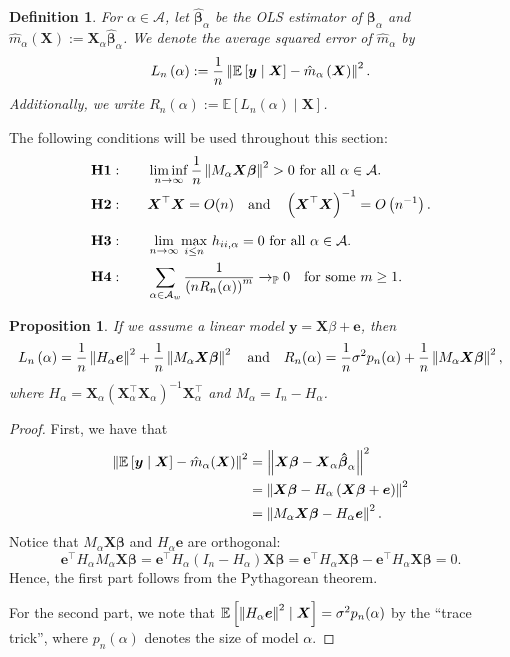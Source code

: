 \documentclass[12pt, letter paper]{article}
\newcommand{\1}{\mathmybb{1}}
\newtheorem{definition}{Definition}[section]
\newtheorem{proposition}{Proposition}[section]
\newcommand{\0}{\emptyset}
\newcommand{\prob}{\mathbb{P}}
\newcommand{\Ep}[1]{\mathbb{E}\left[ #1 \right]}
\newcommand{\paren}[1]{\left(#1 \right)}
\newcommand{\norm}[1]{\left|\hspace{-1pt}\left|#1 \right|\hspace{-1pt}\right|}
\newcommand{\normsq}[1]{\norm{#1}^{2}}
\newcommand{\Acal}{\mathcal{A}}
\newcommand{\X}{\boldsymbol{X}}
\newcommand{\y}{\boldsymbol{y}}
\newcommand{\e}{\boldsymbol{e}}
\newcommand{\bbeta}{\boldsymbol{\beta}}
\newcommand{\bbetahat}{\boldsymbol{\hat{\beta}}}
\newcommand{\Loss}[1]{L_{n}\paren{#1}}
\begin{document}
\begin{definition}
    For \(\alpha\in\Acal\), let \(\bbetahat_{\alpha}\) be the OLS estimator of \(\bbeta_{\alpha}\) and \(\hat{m}_{\alpha}(\X):=\X_{\alpha}\bbetahat_{\alpha}\). We denote the average squared error of \(\hat{m}_{\alpha}\) by
    \[\Loss{\alpha}:=\frac{1}{n}\normsq{\Ep{\y\mid\X} - \hat{m}_{\alpha}\paren{\X}}.\]
    Additionally, we write
    \(R_{n}(\alpha):= \Ep{\Loss{\alpha}\mid\X}\).
\end{definition}

    The following conditions will be used throughout this section:
    \begin{align*}
        &\mathbf{H1:}\qquad \liminf_{n\to\infty} \frac{1}{n}\normsq{M_{\alpha}\X\bbeta}>0 \text{ for all }\alpha \in\Acal.\\
        &\mathbf{H2:} \qquad \X^{\top}\X = O(n)\quad\text{and}\quad\paren{\X^{\top}\X}^{-1}= O\paren{n^{-1}}.\\[2.5mm]
        &\mathbf{H3:}\qquad \lim_{n\to\infty}\max_{i\leq n}\,h_{ii,\alpha} = 0 \text{ for all }\alpha \in\Acal.\\
        &\mathbf{H4:}\qquad \sum_{\alpha\in\Acal_{w}}\frac{1}{\paren{nR_{n}(\alpha)}^{m}}\to_{\prob}0\quad\text{for some }m\geq 1.
    \end{align*}

\begin{proposition}
    If we assume a linear model \(\y = \X\beta + \e\), then
    \[\Loss{\alpha} = \frac{1}{n}\normsq{H_{\alpha}\e} + \frac{1}{n}\normsq{M_{\alpha}\X\bbeta}\quad\text{and}\quad R_{n}(\alpha) = \frac{1}{n}\sigma^{2}p_{n}(\alpha) + \frac{1}{n}\normsq{M_{\alpha}\X\bbeta},\]
    where \(H_{\alpha} = \X_{\alpha}\paren{\X_{\alpha}^{\top}\X_{\alpha}}^{-1}\X_{\alpha}^{\top}\) and \(M_{\alpha}= I_{n} - H_{\alpha}\).
\end{proposition}

\begin{proof}
    First, we have that
    \begin{align*}
        \normsq{\Ep{\y\mid\X} - \hat{m}_{\alpha}(\X)} &= \normsq{\X\bbeta - \X_{\alpha}\bbetahat_{\alpha}}\\
        &= \normsq{\X\bbeta - H_{\alpha}\paren{\X\bbeta + \e}}\\
        &= \normsq{M_{\alpha}\X\bbeta - H_{\alpha}\e}.
    \end{align*}
    Notice that \(M_{\alpha}\X\bbeta\) and \(H_{\alpha}\e\) are orthogonal:
    \[\e^{\top}H_{\alpha}M_{\alpha}\X\bbeta  = \e^{\top}H_{\alpha}\paren{I_{n} - H_{\alpha}}\X\bbeta = \e^{\top}H_{\alpha}\X\bbeta - \e^{\top}H_{\alpha}\X\bbeta = 0.\]
    Hence, the first part follows from the Pythagorean theorem.

    For the second part, we note that \(\Ep{\normsq{H_{\alpha}\e}\mid\X} = \sigma^{2}p_{n}(\alpha)\) by the ``trace trick'', where \(p_{n}(\alpha)\) denotes the size of model \(\alpha\).
\end{proof}
\end{document}
